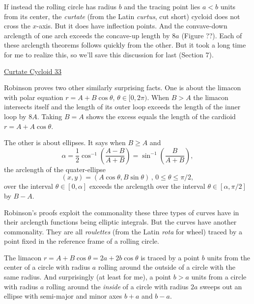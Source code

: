 \documentclass{ximera}
\begin{document}
If instead the rolling circle has radius $b$ and the tracing point lies $a<b$ units from its center,  the \emph{curtate} (from the Latin \emph{curtus}, cut short) cycloid does not cross the $x$-axis. But it does have inflection points. And the convave-down arclength of one arch exceeds the concave-up length by $8a$ (Figure ??). Each of these arclength theorems follows quickly from the other. But it took a long time for me to realize this, so we'll save this discussion for last (Section 7).

\begin{onlineOnly}
    \begin{center}
\end{center}
\end{onlineOnly}

\href{https://www.desmos.com/calculator/0eosvsfm9r}{Curtate Cycloid 33}

 
Robinson proves two other similarly surprising facts. One is about the limacon with polar equation $r=A + B\cos\theta$, $\theta\in [0,2\pi)$. When $B>A$ the limacon intersects itself and the length of its outer loop exceeds the length of the inner loop by $8A$. Taking $B=A$ shows the excess equals the length of the cardioid $r=A + A\cos\theta$.

The other is about ellipses. It says when $B\geq A$ and 
\[
      \alpha = \frac{1}{2} \cos^{-1} \left( \frac{A-B}{A+B}  \right)  =  \sin^{-1}\left( \frac{B}{A+B}  \right) ,
\]
the arclength of the quater-ellipse
\[
   (x,y) = (A \cos\theta , B\sin\theta) \, , \, 0\leq \theta \leq \pi/2 ,
\]
over the interval $\theta \in [0,\alpha]$ exceeds the arclength over the interval $\theta\in [\alpha, \pi/2]$ by $B-A$.

Robinson's proofs exploit the commonality these three types of curves have in their arclength functions being elliptic integrals. But the curves have another commonality. They are all \emph{roulettes} (from the Latin \emph{rota} for wheel) traced by a point fixed in the reference frame of a rolling circle.


The limacon $r=A+B\cos\theta = 2a + 2b \cos\theta$ is traced by a point $b$ units from the center of a circle with radius $a$ rolling around the outside of a circle with the same radius. And surprisingly (at least for me), a point $b>a$ units from a circle with radius $a$ rolling around the \emph{inside} of a circle with radius $2a$ sweeps out an ellipse with semi-major and minor axes $b+a$ and $b-a$.
\end{document}
